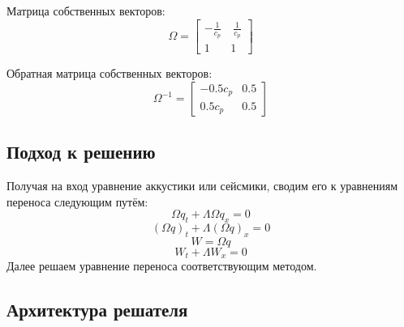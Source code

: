 \documentclass{article}
\begin{document}
Матрица собственных векторов:
\begin{equation}
 \Omega = \left[\begin{array}{crlcc}
-\frac{1}{c_p} & \ \frac{1}{c_p} \\
 1 & 1
\end{array}\right] 
\end{equation}

Обратная матрица собственных векторов:
\begin{equation}
\Omega^{-1} = \left[\begin{array}{crlcc}
- 0.5 c_p & 0.5  \\
 0.5 c_p & 0.5
\end{array}\right] 
\end{equation}

\subsection{Подход к решению}
Получая на вход уравнение аккустики или сейсмики, сводим его к уравнениям переноса следующим путём:
\begin{equation}
\Omega q_t + \Lambda \Omega q_x = 0 
\end{equation}
\begin{equation}
{(\Omega q)}_t + \Lambda {(\Omega q)}_x = 0
\end{equation}
\begin{equation}
W = \Omega q
\end{equation}
\begin{equation}
W_t + \Lambda W_x = 0
\end{equation}
Далее решаем уравнение переноса соответствующим методом.

\subsection{Архитектура решателя}
\end{document}

